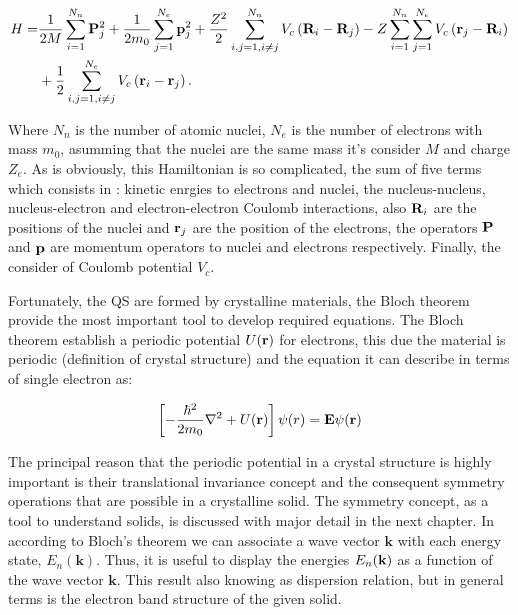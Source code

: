 \begin{equation}
\begin{split}
	H  =  &\dfrac{1}{2M}\sum\limits_{i=1}^{N_{n}} \mathrm{\bf P}_{j}^{2} + \dfrac{1}{2m_{0}} \sum\limits_{j=1}^{N_{e}} \mathrm{\bf p}_{j}^{2} + \dfrac{Z^{2}}{2} \sum\limits_{i,j=1,i\neq j}^{N_{n}} V_{c}\left(\mathrm{\bf R}_{i}-\mathrm{\bf R}_{j}\right)-Z\sum\limits_{i=1}^{N_{n}}\sum\limits_{j=1}^{N_{e}}V_{c}\left(\mathrm{\bf r}_{j}-\mathrm{\bf R}_{i}\right) \\
	   & + \dfrac{1}{2} \sum\limits_{i,j=1,i\neq j}^{N_{e}} V_{c} \left(\mathrm{\bf r}_{i}-\mathrm{\bf r}_{j}\right).
\end{split}
\label{eq:chapter-1-solid-hamiltonian}
\end{equation}

Where  $N_{n}$ is the number of atomic nuclei, $N_{e}$ is the number of electrons with mass $m_{0}$, asumming that the nuclei are the same mass it's consider  $M$ and charge $Z_{e}$. As is obviously, this Hamiltonian is so complicated, the sum of five terms which consists in : kinetic enrgies to electrons and nuclei, the nucleus-nucleus, nucleus-electron and electron-electron Coulomb interactions, also $\mathrm{\bf R}_{i}$ are the positions of the nuclei and $\mathrm{\bf r}_{j}$ are the position of the electrons, the operators $\mathrm{\bf P}$ and $\mathrm{\bf p}$ are momentum operators to nuclei and electrons respectively.  Finally, the consider of  Coulomb potential $V_{c}$\cite{alloul2010introduction}.  


Fortunately, the QS are formed by crystalline materials, the Bloch theorem provide the most important tool to develop required equations. The Bloch theorem establish a periodic potential $U(\displaystyle\mathrm{\bf r})$ for electrons, this due the material is periodic (definition of crystal structure) and the \sch equation it can describe in terms of single electron  as:  


\begin{equation}
	\left[-\dfrac{\hbar^2}{2m_{0}}\nabla^2 + U(\displaystyle\mathrm{\bf r})\right]\psi (r)=\displaystyle\mathrm{\bf E}\psi(\displaystyle\mathrm{\bf r})
	\label{eq:chapter-1-first-sch}
\end{equation}

The principal reason that the periodic potential in a crystal structure is highly important is their translational invariance concept and the consequent symmetry operations that are possible in a crystalline solid. The symmetry concept, as a  tool to understand solids, is discussed with major detail in the next chapter. In according to Bloch's theorem we can associate a wave vector $\boldsymbol{k}$ with each energy state, $E_{n}(\boldsymbol{k})$. Thus, it is useful to display the energies $E_{n}(\bf{k})$ as a function of the wave vector $\boldsymbol{k}$. This result also knowing as dispersion relation, but in general terms is the electron band structure of the given solid\cite{piprek2017handbook}.   


